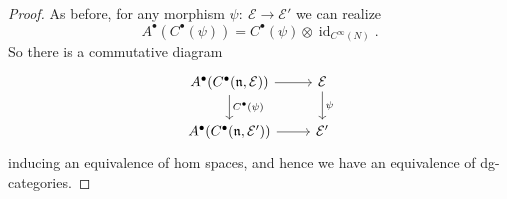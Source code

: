 \documentclass[11pt]{article}
\numberwithin{equation}{section}
\numberwithin{equation}{section}
\def\cE{\mathcal E}\def\cF{\mathcal F}\def\cG{\mathcal G}\def\cH{\mathcal H}
\def\bu{\bullet}
\DeclareMathOperator{\id}{id}
\begin{document}
\begin{proof}
	As before, for any morphism $\psi \colon \ \cE \to \cE'$ we can realize
	\begin{equation*}
	A^\bu(C^\bu(\psi)) = C^\bullet(\psi) \otimes \id_{C^\infty(N)} .
	\end{equation*}
	So there is a commutative diagram
	\begin{equation*}
	\begin{tikzcd}
	A^\bullet(C^\bullet(\fn,\cE)) \arrow[r] \arrow[d, "C^\bullet(\psi)"] & \cE \arrow[d , "\psi"] \\
	A^\bullet(C^\bullet(\fn,\cE')) \arrow[r] & \cE'
	\end{tikzcd}
	\end{equation*}
	inducing an equivalence of hom spaces, and hence we have an equivalence of dg-categories.
\end{proof}
\end{document}
